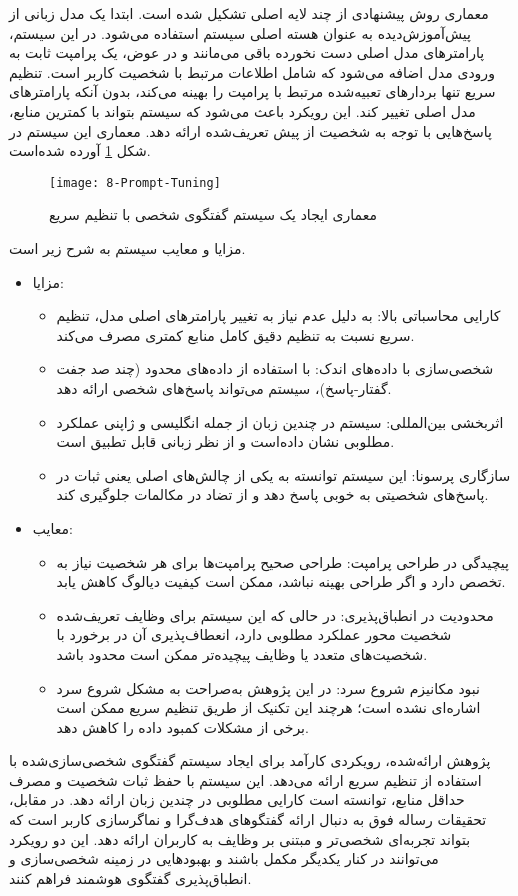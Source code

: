 \begin{enumerate}
معماری روش پیشنهادی%
\cite{kasahara2022building}
 از چند لایه اصلی تشکیل شده است. ابتدا یک مدل زبانی از پیش‌آموزش‌دیده به عنوان هسته اصلی سیستم استفاده می‌شود. در این سیستم، پارامترهای مدل اصلی دست نخورده باقی می‌مانند و در عوض، یک پرامپت ثابت به ورودی مدل اضافه می‌شود که شامل اطلاعات مرتبط با شخصیت کاربر است. تنظیم سریع تنها بردارهای تعبیه‌شده مرتبط با پرامپت را بهینه می‌کند، بدون آنکه پارامترهای مدل اصلی تغییر کند. این رویکرد باعث می‌شود که سیستم بتواند با کمترین منابع، پاسخ‌هایی با توجه به شخصیت از پیش تعریف‌شده ارائه دهد.
معماری این سیستم در شکل
\ref{fig:Prompt-Tuning}
آورده شده‌است.

\begin{figure}[ht]
	\centerline{\texttt{[image: 8-Prompt-Tuning]}}
		\caption{معماری ایجاد یک سیستم گفتگوی شخصی با تنظیم سریع 
			\cite{kasahara2022building}
	}
	\label{fig:Prompt-Tuning}
\end{figure}

مزایا و معایب سیستم به شرح زیر است.
\begin{itemize}
\item
مزایا:
\begin{itemize}
\item
کارایی محاسباتی بالا: به دلیل عدم نیاز به تغییر پارامترهای اصلی مدل، تنظیم سریع نسبت به تنظیم دقیق کامل منابع کمتری مصرف می‌کند.
\item
شخصی‌سازی با داده‌های اندک: با استفاده از داده‌های محدود (چند صد جفت گفتار-پاسخ)، سیستم می‌تواند پاسخ‌های شخصی ارائه دهد.
\item
اثربخشی بین‌المللی: سیستم در چندین زبان از جمله انگلیسی و ژاپنی عملکرد مطلوبی نشان داده‌است و از نظر زبانی قابل تطبیق است.
\item
سازگاری پرسونا: این سیستم توانسته به یکی از چالش‌های اصلی یعنی ثبات در پاسخ‌های شخصیتی به خوبی پاسخ دهد و از تضاد در مکالمات جلوگیری کند.
\end{itemize}


\item
معایب:
\begin{itemize}
\item
پیچیدگی در طراحی پرامپت: طراحی صحیح پرامپت‌ها برای هر شخصیت نیاز به تخصص دارد و اگر طراحی بهینه نباشد، ممکن است کیفیت دیالوگ کاهش یابد.
\item
محدودیت در انطباق‌پذیری: در حالی که این سیستم برای وظایف تعریف‌شده شخصیت محور عملکرد مطلوبی دارد، انعطاف‌پذیری آن در برخورد با شخصیت‌های متعدد یا وظایف پیچیده‌تر ممکن است محدود باشد.
\item
نبود مکانیزم شروع سرد: در این پژوهش به‌صراحت به مشکل شروع سرد اشاره‌ای نشده است؛ هرچند این تکنیک از طریق تنظیم سریع ممکن است برخی از مشکلات کمبود داده را کاهش دهد.
\end{itemize}
\end{itemize}
پژوهش ارائه‌شده، رویکردی کارآمد برای ایجاد سیستم گفتگوی شخصی‌سازی‌شده با استفاده از تنظیم سریع ارائه می‌دهد. این سیستم با حفظ ثبات شخصیت و مصرف حداقل منابع، توانسته است کارایی مطلوبی در چندین زبان ارائه دهد. در مقابل، تحقیقات رساله فوق به دنبال ارائه گفتگوهای هدف‌گرا و نماگر‌سازی کاربر است که بتواند تجربه‌ای شخصی‌تر و مبتنی بر وظایف به کاربران ارائه دهد. این دو رویکرد می‌توانند در کنار یکدیگر مکمل باشند و بهبودهایی در زمینه شخصی‌سازی و انطباق‌پذیری گفتگوی هوشمند فراهم کنند.



\end{enumerate}
